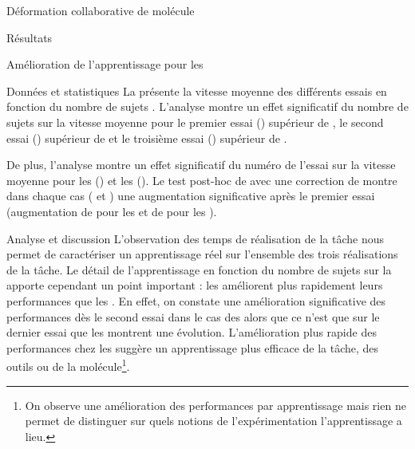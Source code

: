 \documentclass[myfrancais,ngerman,english,french]{mythesis}
\begin{document}
\begin{mychapter}{Déformation collaborative de molécule}
\begin{mysection}{Résultats}
\begin{mysubsection}{Amélioration de l'apprentissage pour les }
\begin{mysubsubsection}{Données et statistiques}
					La  présente la vitesse moyenne  des différents essais  en fonction du nombre de sujets .
					L'analyse montre un effet significatif du nombre de sujets  sur la vitesse moyenne  pour le premier essai () supérieur de , le second essai () supérieur de  et le troisième essai () supérieur de .

					De plus, l'analyse montre un effet significatif du numéro de l'essai  sur la vitesse moyenne  pour les  () et les  ().
					Le test post-hoc de  avec une correction de  montre dans chaque cas ( et ) une augmentation significative après le premier essai (augmentation de  pour les  et de  pour les ).
				\end{mysubsubsection}
				\begin{mysubsubsection}{Analyse et discussion}
					L'observation des temps de réalisation de la tâche  nous permet de caractériser un apprentissage réel sur l'ensemble des trois réalisations de la tâche.
					Le détail de l'apprentissage en fonction du nombre de sujets sur la  apporte cependant un point important : les  améliorent plus rapidement leurs performances que les .
					En effet, on constate une amélioration significative des performances dès le second essai dans le cas des  alors que ce n'est que sur le dernier essai que les  montrent une évolution.
					L'amélioration plus rapide des performances chez les  suggère un apprentissage plus efficace de la tâche, des outils ou de la molécule\footnote{On observe une amélioration des performances par apprentissage mais rien ne permet de distinguer sur quels notions de l'expérimentation l'apprentissage a lieu.}.


\end{mysubsubsection}
\end{mysubsection}
\end{mysection}
\end{mychapter}
\end{document}
